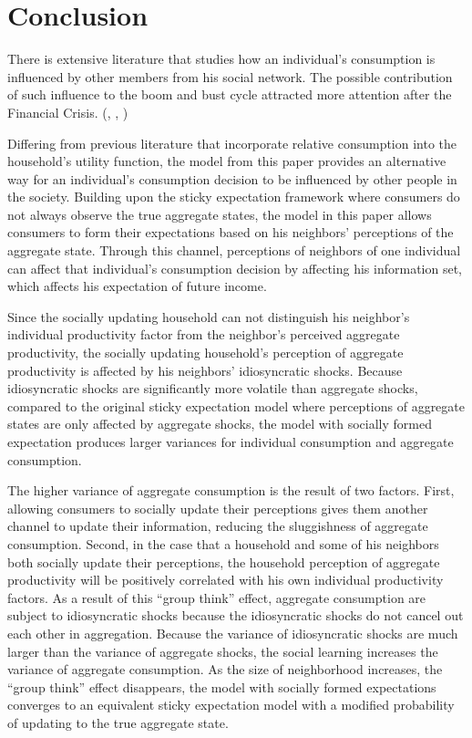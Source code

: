 \documentclass[12pt,letterpaper]{article}
\begin{document}
\section{Conclusion}
There is extensive literature that studies how an individual's consumption is influenced by other members from his social network. The possible contribution of such influence to the boom and bust cycle attracted more attention after the Financial Crisis. (\cite{FaultLines}, \cite{IMFReport}, \cite{Trickle})
\par
Differing from previous literature that incorporate relative consumption into the household's utility function, the model from this paper provides an alternative way for an individual's consumption decision to be influenced by other people in the society. Building upon the sticky expectation framework where consumers do not always observe the true aggregate states, the model in this paper allows consumers to form their expectations based on his neighbors' perceptions of the aggregate state. Through this channel, perceptions of neighbors of one individual can affect that individual's consumption decision by affecting his information set, which affects his expectation of future income.
\par
Since the socially updating household can not distinguish his neighbor's individual productivity factor from the neighbor's perceived aggregate productivity, the socially updating household's perception of aggregate productivity is affected by his neighbors' idiosyncratic shocks. Because idiosyncratic shocks are significantly more volatile than aggregate shocks, compared to the original sticky expectation model where perceptions of aggregate states are only affected by aggregate shocks, the model with socially formed expectation produces larger variances for individual consumption and aggregate consumption.
\par
The higher variance of aggregate consumption is the result of two factors. First, allowing consumers to socially update their perceptions gives them another channel to update their information, reducing the sluggishness of aggregate consumption. Second, in the case that a household and some of his neighbors both socially update their perceptions, the household perception of aggregate productivity will be positively correlated with his own individual productivity factors. As a result of this ``group think'' effect, aggregate consumption are subject to idiosyncratic shocks because the idiosyncratic shocks do not cancel out each other in aggregation. Because the variance of idiosyncratic shocks are much larger than the variance of aggregate shocks, the social learning increases the variance of aggregate consumption. As the size of neighborhood increases, the ``group think'' effect disappears, the model with socially formed expectations converges to an equivalent sticky expectation model with a modified probability of updating to the true aggregate state.
\end{document}

